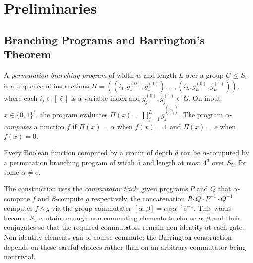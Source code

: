 \documentclass[version=final]{iacrcc}
\begin{document}
\section{Preliminaries}
\label{sec:prelim}

\subsection{Branching Programs and Barrington's Theorem}

\begin{definition}
A \emph{permutation branching program} of width $w$ and length $L$ over a group
$G \leq S_w$ is a sequence of instructions
$\Pi = ((i_1, g_1^{(0)}, g_1^{(1)}), \ldots, (i_L, g_L^{(0)}, g_L^{(1)}))$,
where each $i_j \in [\ell]$ is a variable index and $g_j^{(0)}, g_j^{(1)} \in G$.
On input $x \in \{0,1\}^\ell$, the program evaluates
$\Pi(x) = \prod_{j=1}^{L} g_j^{(x_{i_j})}$.
The program $\alpha$-\emph{computes} a function $f$ if $\Pi(x) = \alpha$ when
$f(x) = 1$ and $\Pi(x) = e$ when $f(x) = 0$.
\end{definition}

\begin{theorem}
\label{thm:barrington}
Every Boolean function computed by a circuit of depth $d$ can be
$\alpha$-computed by a permutation branching program of width $5$ and
length at most $4^d$ over $S_5$, for some $\alpha \neq e$.
\end{theorem}

The construction uses the \emph{commutator trick}: given programs $P$ and $Q$
that $\alpha$-compute $f$ and $\beta$-compute $g$ respectively, the concatenation
$P \cdot Q \cdot P^{-1} \cdot Q^{-1}$ computes $f \wedge g$ via the group
commutator $[\alpha, \beta] = \alpha\beta\alpha^{-1}\beta^{-1}$. This works because
$S_5$ contains enough non-commuting elements to choose $\alpha,\beta$ and their
conjugates so that the required commutators remain non-identity at each gate.
Non-identity elements can of course commute; the Barrington construction depends
on these careful choices rather than on an arbitrary commutator being nontrivial.
\end{document}

